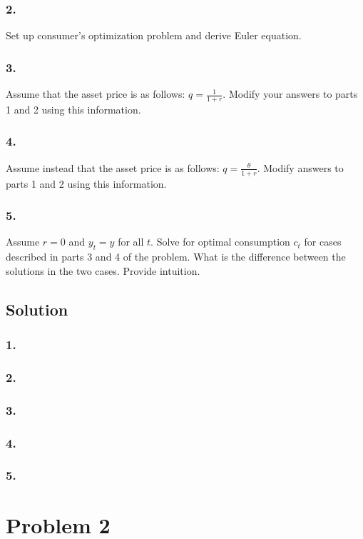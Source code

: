 \documentclass[10pt, a4paper]{article}
\begin{document}
    \subsubsection*{2.}
      Set up consumer's optimization problem and derive Euler equation.
    \subsubsection*{3.}
      Assume that the asset price is as follows: $q=\frac{1}{1+r}$. Modify your answers to parts 1 and 2 using this information.
    \subsubsection*{4.}
      Assume instead that the asset price is as follows: $q=\frac{\theta}{1+r}$. Modify answers to parts 1 and 2 using this information.
    \subsubsection*{5.}
      Assume $r=0$ and $y_t=y$ for all $t$. Solve for optimal consumption $c_t$ for cases described in parts 3 and 4 of the problem. What is the difference between the solutions in the two cases. Provide intuition. 
  \subsection*{Solution}
    \subsubsection*{1.}
    \subsubsection*{2.}
    \subsubsection*{3.}
    \subsubsection*{4.}
    \subsubsection*{5.}
  \section*{Problem 2}
\end{document}
